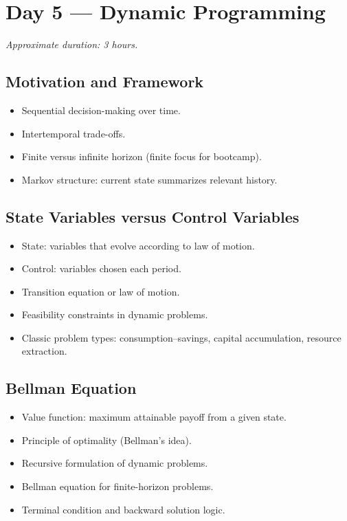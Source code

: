 \documentclass[11pt,a4paper]{article}
\begin{document}
\section{Day 5 --- Dynamic Programming}

\textit{Approximate duration: 3 hours.}

\subsection{Motivation and Framework}
\begin{itemize}[leftmargin=*]
    \item Sequential decision-making over time.
    \item Intertemporal trade-offs.
    \item Finite versus infinite horizon (finite focus for bootcamp).
    \item Markov structure: current state summarizes relevant history.
\end{itemize}

\subsection{State Variables versus Control Variables}
\begin{itemize}[leftmargin=*]
    \item State: variables that evolve according to law of motion.
    \item Control: variables chosen each period.
    \item Transition equation or law of motion.
    \item Feasibility constraints in dynamic problems.
    \item Classic problem types: consumption--savings, capital accumulation, resource extraction.
\end{itemize}

\subsection{Bellman Equation}
\begin{itemize}[leftmargin=*]
    \item Value function: maximum attainable payoff from a given state.
    \item Principle of optimality (Bellman's idea).
    \item Recursive formulation of dynamic problems.
    \item Bellman equation for finite-horizon problems.
    \item Terminal condition and backward solution logic.
\end{itemize}
\end{document}

